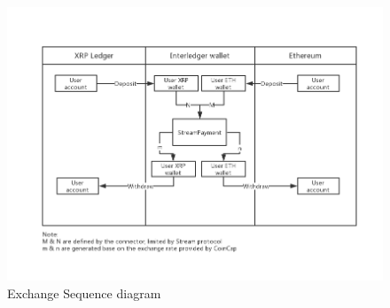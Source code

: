 \begin{figure}[htb!]
    \includegraphics[width=1\textwidth]{./figures/interledgerWallet}
        \centering
        \caption{Exchange Sequence diagram}
        \centering
        \label{fig:flow}

\end{figure}

